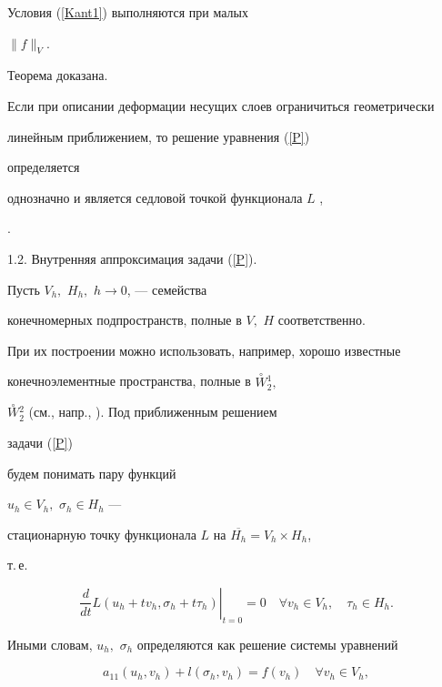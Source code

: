 Условия (\ref{Kant1}) выполняются при малых


$\|f\|_{V}$.


Теорема доказана.


\begin{note}


Если при описании деформации несущих слоев ог\-ра\-ничиться геометрически 


линейным приближением, то решение ура\-в\-не\-ния (\ref{P})


определяется 


однозначно и является седловой точкой функционала $ L $ \cite{Kar2},


\cite{Kar3}.


\end{note}





1.2. Внутренняя аппроксимация задачи (\ref{P}).


Пусть $V_h,$ $ H_h,$ $ h \to 0$, --- семейства 


конечномерных подпространств, полные в $V,$ $ H$ соответственно. 


При их построении можно использовать, например, хорошо известные 


конечноэлементные пространства, полные в $ \overset\circ W{}^1_2,$ 


$\overset\circ W{}^2_2 $ (см., напр., \cite{Cia}). Под приближенным решением


задачи (\ref{P})


будем понимать пару функций 


$u_h \in V_h,$ $\sigma_h \in H_h $ ---


стационарную точку функционала $L$ на $ \overline {H_h} = V_h \times H_h $,


т.\,е.


$$


\left . \frac{d}{dt} L(u_h + tv_h, \sigma_h + 


t \tau _h) \right | _{t=0} = 0 \quad


\forall v_h \in V_h,\quad \tau _{h} \in H_h.


$$


Иными словам, $u_{h},$ $ \sigma_h $ определяются как решение системы уравнений


\begin{equation}


\label{Gal1}


a_{11}(u_h, v_h) + l(\sigma_h, v_{h}) = f(v_h) \quad


\forall v_h \in V_h ,


\end{equation}


